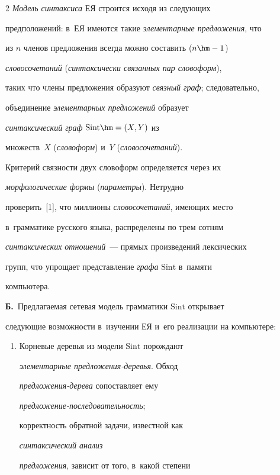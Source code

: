 \begin{multicols}{2}
     \textit{Модель синтаксиса} ЕЯ строится исходя из следующих 

предположений: в~ЕЯ имеются такие \textit{элементарные предложения}, что 

из $n$ членов предложения всегда можно составить ($n\hm-1$) 

\textit{словосочетаний} (\textit{синтаксически связанных пар словоформ}), 

таких что члены предложения образуют \textit{связный граф}; следовательно, 

объединение \textit{элементарных предложений} образует 

\textit{синтаксический граф} $\mathrm{Sint}\hm = (X, Y)$ из 

множеств~$X$ (\textit{словоформ}) и~$Y$ (\textit{словосочетаний}). 

Критерий связности двух словоформ определяется через их 

\textit{морфологические формы} (\textit{параметры}). Нетрудно 

проверить~[1], что миллионы \textit{словосочетаний}, имеющих место 

в~грамматике русского языка, распределены по трем сотням 

\textit{синтаксических отношений}~--- прямых произведений лексических 

групп, что упрощает представление \textit{графа} $\mathrm{Sint}$ в~памяти 

компьютера.

     

    \textbf{Б.}\ Предлагаемая сетевая модель грамматики $\mathrm{Sint}$ открывает 

следующие возможности в~изучении ЕЯ и~его реализации на компьютере:

    \begin{enumerate}[1.]

    \item Корневые деревья из модели $\mathrm{Sint}$ порождают 

\textit{элементарные пред\-ло\-же\-ния-де\-ревья}. Обход 

\textit{пред\-ло\-же\-ния-де\-ре\-ва} сопоставляет ему 

\textit{пред\-ло\-же\-ние-по\-сле\-до\-ва\-тель\-ность}; 

корректность обратной задачи, известной как 

\textit{синтаксический анализ}\linebreak

\textit{предложения}, зависит от того, в~какой степени\linebreak 


\end{enumerate}
\end{multicols}
